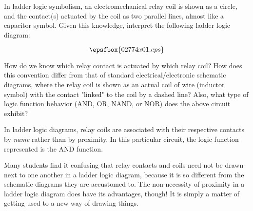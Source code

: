 

In ladder logic symbolism, an electromechanical relay coil is shown as a circle, and the contact(s) actuated by the coil as two parallel lines, almost like a capacitor symbol.  Given this knowledge, interpret the following ladder logic diagram:

$$\epsfbox{02774x01.eps}$$

How do we know which relay contact is actuated by which relay coil?  How does this convention differ from that of standard electrical/electronic schematic diagrams, where the relay coil is shown as an actual coil of wire (inductor symbol) with the contact "linked" to the coil by a dashed line?  Also, what type of logic function behavior (AND, OR, NAND, or NOR) does the above circuit exhibit?







In ladder logic diagrams, relay coils are associated with their respective contacts by {\it name} rather than by proximity.  In this particular circuit, the logic function represented is the AND function.







Many students find it confusing that relay contacts and coils need not be drawn next to one another in a ladder logic diagram, because it is so different from the schematic diagrams they are accustomed to.  The non-necessity of proximity in a ladder logic diagram does have its advantages, though!  It is simply a matter of getting used to a new way of drawing things.




